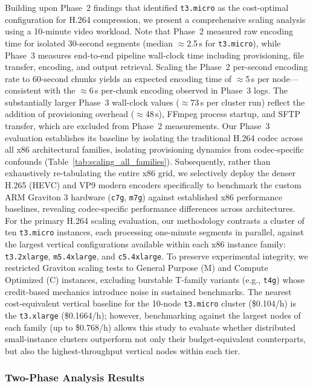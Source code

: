 \documentclass[conference]{IEEEtran}
\begin{document}
Building upon Phase~2 findings that identified \texttt{t3.micro} as the
cost-optimal configuration for H.264 compression, we present a comprehensive scaling
analysis using a 10-minute video workload. Note that Phase~2 measured raw encoding
time for isolated 30-second segments (median $\approx$2.5\,s for \texttt{t3.micro}),
while Phase~3 measures end-to-end pipeline wall-clock time including provisioning,
file transfer, encoding, and output retrieval. Scaling the Phase~2 per-second
encoding rate to 60-second chunks yields an expected encoding time of $\approx$5\,s
per node---consistent with the $\approx$6\,s per-chunk encoding observed in
Phase~3 logs. The substantially larger Phase~3 wall-clock values ($\approx$73\,s per
cluster run) reflect the addition of provisioning overhead ($\approx$48\,s), FFmpeg
process startup, and SFTP transfer, which are excluded from Phase~2 measurements. Our Phase~3 evaluation establishes its baseline by isolating the traditional H.264 codec across all x86 architectural families, isolating provisioning dynamics from codec-specific confounds (Table~\ref{tab:scaling_all_families}). Subsequently, rather than exhaustively re-tabulating the entire x86 grid, we selectively deploy the denser H.265 (HEVC) and VP9 modern encoders specifically to benchmark the custom ARM Graviton 3 hardware (\texttt{c7g}, \texttt{m7g}) against established x86 performance baselines, revealing codec-specific performance differences across architectures. For the primary H.264 scaling evaluation, our methodology contrasts a cluster of ten
\texttt{t3.micro} instances, each processing one-minute segments in parallel,
against the largest vertical configurations available within each x86 instance
family: \texttt{t3.2xlarge}, \texttt{m5.4xlarge}, and \texttt{c5.4xlarge}. To preserve experimental integrity, we restricted Graviton scaling tests to General Purpose (M) and Compute Optimized (C) instances, excluding burstable T-family variants (e.g., \texttt{t4g}) whose credit-based mechanics introduce noise in sustained benchmarks. The nearest cost-equivalent vertical baseline for the 10-node \texttt{t3.micro}
cluster (\$0.104/h) is the \texttt{t3.xlarge} (\$0.1664/h); however,
benchmarking against the largest nodes of each family (up to \$0.768/h) allows
this study to evaluate whether distributed small-instance clusters outperform
not only their budget-equivalent counterparts, but also the highest-throughput
vertical nodes within each tier.

\subsubsection{Two-Phase Analysis Results}
\end{document}
